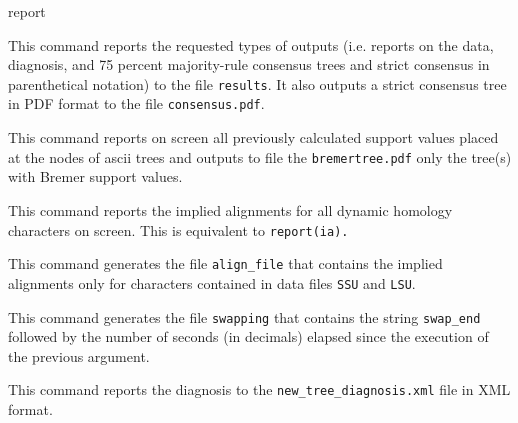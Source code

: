 \begin{command}{report}{}
\begin{poyexamples}
{This command reports the requested types of outputs (i.e.
reports on the data, diagnosis, and 75 percent majority-rule consensus 
trees and strict consensus in parenthetical notation) to the file
\texttt{results}. It also outputs a strict consensus tree in PDF format
to the file \texttt{consensus.pdf}.}

{This command reports on screen all previously calculated support values
placed at the nodes of ascii trees and outputs to file the \texttt{bremertree.pdf}
only the tree(s) with Bremer support values.}

{This command reports the implied alignments for all dynamic homology
characters on screen. This is equivalent to \texttt{report(ia).}}

{This command generates the file \texttt{align\_file} that contains
the implied alignments only for characters contained in data files
\texttt{SSU} and \texttt{LSU}.}

{This command generates the file \texttt{swapping} that contains
the string \texttt{swap\_end} followed by the number of seconds (in
decimals) elapsed since the execution of the previous 
argument.}

{This command reports the diagnosis to the \texttt{new\_tree\_diagnosis.xml}
file in XML format.}

\end{poyexamples}

\begin{poyalso}
\end{poyalso}

\end{command}


